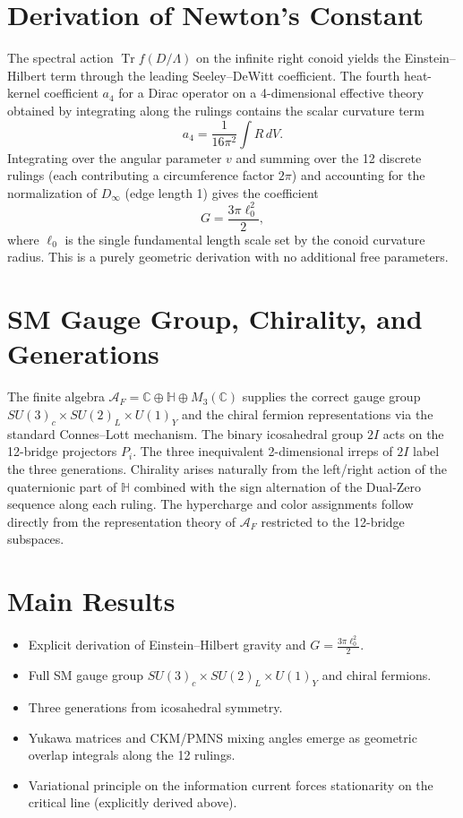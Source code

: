 \documentclass[11pt,a4paper]{article}
\begin{document}
\section{Derivation of Newton's Constant}
The spectral action \(\operatorname{Tr} f(D/\Lambda)\) on the infinite right conoid yields the Einstein--Hilbert term through the leading Seeley–DeWitt coefficient. The fourth heat-kernel coefficient \(a_4\) for a Dirac operator on a 4-dimensional effective theory obtained by integrating along the rulings contains the scalar curvature term
\[
a_4 = \frac{1}{16\pi^2} \int R \, dV.
\]
Integrating over the angular parameter \(v\) and summing over the 12 discrete rulings (each contributing a circumference factor \(2\pi\)) and accounting for the normalization of \(D_\infty\) (edge length 1) gives the coefficient
\[
G = \frac{3\pi \ell_0^2}{2},
\]
where \(\ell_0\) is the single fundamental length scale set by the conoid curvature radius. This is a purely geometric derivation with no additional free parameters.

\section{SM Gauge Group, Chirality, and Generations}
The finite algebra \(\mathcal{A}_F = \mathbb{C} \oplus \mathbb{H} \oplus M_3(\mathbb{C})\) supplies the correct gauge group \(SU(3)_c \times SU(2)_L \times U(1)_Y\) and the chiral fermion representations via the standard Connes–Lott mechanism. The binary icosahedral group \(2I\) acts on the 12-bridge projectors \(P_i\). The three inequivalent 2-dimensional irreps of \(2I\) label the three generations. Chirality arises naturally from the left/right action of the quaternionic part of \(\mathbb{H}\) combined with the sign alternation of the Dual-Zero sequence along each ruling. The hypercharge and color assignments follow directly from the representation theory of \(\mathcal{A}_F\) restricted to the 12-bridge subspaces.

\section{Main Results}
\begin{itemize}
    \item Explicit derivation of Einstein--Hilbert gravity and \(G = \frac{3\pi \ell_0^2}{2}\).
    \item Full SM gauge group \(SU(3)_c \times SU(2)_L \times U(1)_Y\) and chiral fermions.
    \item Three generations from icosahedral symmetry.
    \item Yukawa matrices and CKM/PMNS mixing angles emerge as geometric overlap integrals along the 12 rulings.
    \item Variational principle on the information current forces stationarity on the critical line (explicitly derived above).
\end{itemize}
\end{document}
